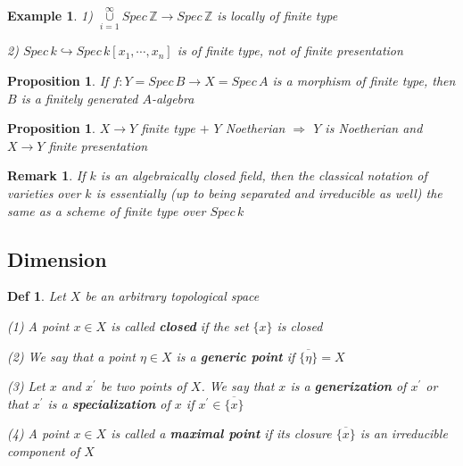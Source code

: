 \documentclass{article}
\newtheorem{definition}[theorem]{Def}
\newtheorem{example}[theorem]{Example}
\newtheorem{proposition}[theorem]{Proposition}
\newtheorem{remark}[theorem]{Remark}
\begin{document}
\begin{example}
    1) $\mathop{\cup}\limits_{i=1}^{\infty}Spec\,\mathbb Z\to Spec\,\mathbb Z$ is locally of finite type

    2) $Spec\, k \hookrightarrow
    Spec\, k[x_1,\cdots,x_n]$ is of finite type, not of finite presentation
\end{example}

\begin{proposition}
    If $f:Y = Spec\, B \to X = Spec\, A$ is a morphism of finite type, then $B$ is a finitely generated $A$-algebra
\end{proposition}

\begin{proposition}
    $X\to Y$ finite type $+$ $Y$ Noetherian $\Rightarrow$ $Y$ is Noetherian and $X\to Y$ finite presentation
\end{proposition}



\begin{remark}
    If $k$ is an algebraically closed field, then the classical notation of varieties over $k$ is essentially (up to being separated and irreducible as well) the same as a scheme of finite type over $Spec\, k$
\end{remark}




\newpage
\subsection{Dimension}

\begin{definition}
    Let $X$ be an arbitrary topological space
    
(1) A point $x \in X$ is called \textbf{closed} if the set $\{x\}$ is closed

(2) We say that a point $\eta \in X$ is a \textbf{generic point} if $\overline{\{\eta\}} = X$

(3) Let $x$ and $x^\prime$ be two points of $X$. We say that $x$ is a \textbf{generization} of $x^\prime$ or that $x^\prime$ is a \textbf{specialization} of $x$ if $x^\prime \in \overline{\{x\}}$ 

(4) A point $x \in X$ is called a \textbf{maximal point} if its closure $\overline{\{x\}}$ is an irreducible component of $X$
\end{definition}
\end{document}
